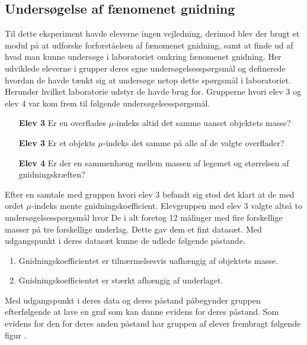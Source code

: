 \subsection*{Undersøgelse af fænomenet gnidning}
Til dette eksperiment havde eleverne ingen vejledning, derimod blev der brugt et modul på at udforske forforståelsen af fænomenet gnidning, samt at finde ud af hvad man kunne undersøge i laboratoriet omkring fænomenet gnidning. Her udviklede eleverne i grupper deres egne undersøgelsesspørgsmål og definerede hvordan de havde tænkt sig at undersøge netop dette spørgsmål i laboratoriet. Herunder hvilket laboratorie udstyr de havde brug for. Grupperne hvori elev 3 og elev 4 var kom frem til følgende undersøgelsesspørgsmål.
\begin{itemize}
	\item[{\bfseries Elev 3}] Er en overflades $\mu$-indeks altid det samme uanset objektets masse?\vspace{-15pt}
	\item[{\bfseries Elev 3}] Er et objekts $\mu$-indeks det samme på alle af de valgte overflader?\vspace{-15pt}
	\item[{\bfseries Elev 4}] Er der en sammenhæng mellem massen af legemet og størrelsen af gnidningskræften?
\end{itemize}
Efter en samtale med gruppen hvori elev 3 befandt sig stod det klart at de med ordet $\mu$-indeks mente gnidningskoefficient. Elevgruppen med elev 3 valgte altså to undersøgelsesspørgsmål hvor De i alt foretog 12 målinger med fire forskellige masser på tre forskellige underlag. Dette gav dem et fint datasæt. Med udgangspunkt i deres datasæt kunne de udlede følgende påstande. 
\begin{enumerate}
	\item Gnidningskoefficientet er tilnærmelsesvis uafhængig af objektets masse.\vspace{-15pt}
	\item Gnidningskoefficientet er stærkt afhængig af underlaget.
\end{enumerate}
Med udgangspunkt i deres data og deres påstand påbegynder gruppen efterfølgende at lave en graf som kan danne evidens for deres påstand. Som evidens for den for deres anden påstand har gruppen af elever frembragt følgende figur .
